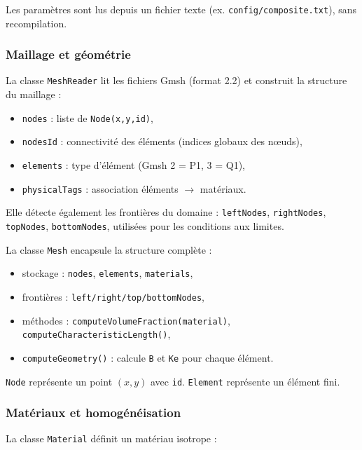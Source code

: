 \documentclass[a4paper,11pt]{article}
\begin{document}
Les paramètres sont lus depuis un fichier texte (ex. \texttt{config/composite.txt}), sans recompilation.

\subsubsection*{Maillage et géométrie}

La classe \texttt{MeshReader} lit les fichiers Gmsh (format 2.2) et construit la structure du maillage :

\begin{itemize}
    \item[$\bullet$] \texttt{nodes} : liste de \texttt{Node(x,y,id)},
    \item[$\bullet$] \texttt{nodesId} : connectivité des éléments (indices globaux des nœuds),
    \item[$\bullet$] \texttt{elements} : type d’élément (Gmsh 2 = P1, 3 = Q1),
    \item[$\bullet$] \texttt{physicalTags} : association éléments $\rightarrow$ matériaux.
\end{itemize}

Elle détecte également les frontières du domaine :
\texttt{leftNodes}, \texttt{rightNodes}, \texttt{topNodes}, \texttt{bottomNodes}, utilisées pour les conditions aux limites.

La classe \texttt{Mesh} encapsule la structure complète :

\begin{itemize}
    \item[$\bullet$] stockage : \texttt{nodes}, \texttt{elements}, \texttt{materials},
    \item[$\bullet$] frontières : \texttt{left/right/top/bottomNodes},
    \item[$\bullet$] méthodes : \texttt{computeVolumeFraction(material)}, \texttt{computeCharacteristicLength()},
    \item[$\bullet$] \texttt{computeGeometry()} : calcule \texttt{B} et \texttt{Ke} pour chaque élément.
\end{itemize}

\texttt{Node} représente un point $(x,y)$ avec \texttt{id}. \texttt{Element} représente un élément fini.

\subsubsection*{Matériaux et homogénéisation}

La classe \texttt{Material} définit un matériau isotrope :
\end{document}
